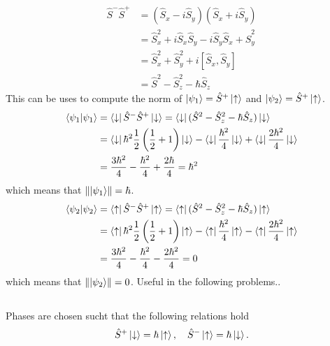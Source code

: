 \documentclass{article}
\begin{document}
\subsection{}
\begin{align*}
\hat{S}^-\hat{S}^+ &=(\hat{S}_x-i\hat{S}_y)(\hat{S}_x+i\hat{S}_y) \\
&= \hat{S}_x^2+i\hat{S}_x\hat{S}_y-i\hat{S}_y\hat{S}_x+\hat{S}_y^2 \\
&= \hat{S}_x^2+\hat{S}_y^2+i[\hat{S}_x,\hat{S}_y] \\
&= \hat{S}^2-\hat{S}_z^2-\hbar\hat{S}_z
\end{align*}
This can be uses to compute the norm of $\ket{\psi_1} = \hat{S}^+\ket{\uparrow}$ and $\ket{\psi_2} = \hat{S}^+\ket{\uparrow}$.
\begin{align*}
\braket{\psi_1} &= \bra{\downarrow}\hat{S}^-\hat{S}^+\ket{\downarrow} = \bra{\downarrow}(\hat{S}^2-\hat{S}_z^2-\hbar\hat{S}_z)\ket{\downarrow} \\
&= \bra{\downarrow}\hbar^2\frac{1}{2}\left(\frac{1}{2} +1 \right)\ket{\downarrow} -\bra{\downarrow}\frac{\hbar^2}{4} \ket{\downarrow} +\bra{\downarrow}\frac{2\hbar^2}{4} \ket{\downarrow} \\
&= \frac{3\hbar^2}{4} -\frac{\hbar^2}{4}+\frac{2\hbar}{4} = \hbar^2 
\end{align*}
which means that $\norm{\ket{\psi_1}} = \hbar$.
\begin{align*}
\braket{\psi_2} &= \bra{\uparrow}\hat{S}^-\hat{S}^+\ket{\uparrow} = \bra{\uparrow}(\hat{S}^2-\hat{S}_z^2-\hbar\hat{S}_z)\ket{\uparrow} \\
&= \bra{\uparrow}\hbar^2\frac{1}{2}\left(\frac{1}{2} +1 \right)\ket{\uparrow} -\bra{\uparrow}\frac{\hbar^2}{4} \ket{\uparrow} -\bra{\uparrow}\frac{2\hbar^2}{4} \ket{\uparrow} \\
&= \frac{3\hbar^2}{4} -\frac{\hbar^2}{4}-\frac{2\hbar^2}{4} = 0
\end{align*}
which means that $\norm{\ket{\psi_2}} = 0$. Useful in the following problems..

\subsection{}

Phases are chosen sucht that the following relations hold
\begin{equation*}
\hat{S}^+\ket{\downarrow}=\hbar\ket{\uparrow}, \quad \hat{S}^-\ket{\uparrow}=\hbar\ket{\downarrow}.
\end{equation*}
\end{document}
